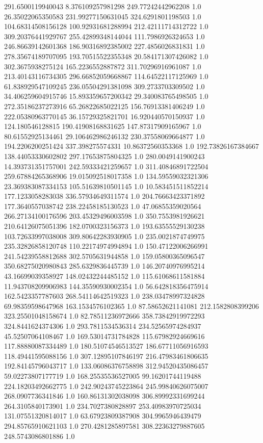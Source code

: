 291.6500119940043	8.376109257981298	249.77242442962208	1.0
26.35022065350583	231.99277150631045	324.6291801198503	1.0
104.68314508156128	100.92931681288994	212.42111714312722	1.0
309.20376441929767	255.42899348144044	111.7986926324653	1.0
246.86639142601368	186.90316892385002	227.4856026831831	1.0
278.35674189707095	193.70515522355348	20.584171307426082	1.0
302.3675938275124	165.2236552887872	311.70296916961087	1.0
213.40143116734305	296.66852059668867	114.64522117125969	1.0
61.838929547109245	236.05504291381098	309.2733703309502	1.0
34.406259604915746	15.893359657200342	29.340083765498505	1.0
272.35186237273916	65.26822685022125	156.76913381406249	1.0
222.05380963770145	36.15729325821701	16.920440570150937	1.0
124.180546128815	190.41908168831625	147.87317909165967	1.0
80.61552925134461	29.106462986246132	230.37558069664877	1.0
194.2206200251424	337.398275574331	10.86372560353368	1.0
192.73826167384667	138.44053330602802	297.17653875804325	1.0
280.0049141900243	14.393731351757001	242.59333421259657	1.0
311.40846891722504	259.67884265368906	19.015092518017358	1.0
134.59559032321306	23.369383087334153	105.51639810501145	1.0
10.583451511852214	177.1233058283038	336.57934649311574	1.0
204.76663423371892	177.3640557038742	238.22458185130523	1.0
47.06855359020564	266.27134100176596	203.45329496003598	1.0
350.7553981926621	210.64126075051396	182.0700323156373	1.0
193.63555529130238	103.72633997038008	309.80642283930905	1.0
235.0021874749975	235.32826858120748	110.22174974994894	1.0
150.47122006266991	241.54239558812688	302.5705631944858	1.0
159.05800365096547	350.68275020980843	285.6329836445739	1.0
146.20740976995214	43.16699039358927	148.02432244485152	1.0
115.61068611581884	11.943708209906983	144.35590930002354	1.0
56.642818356475914	162.5423357787603	268.54114642519323	1.0
238.03478997324828	69.98359598647968	163.1534576102365	1.0
87.58652621141081	212.1582808399206	323.25501048158674	1.0
82.78511236972666	358.73842919972293	324.8441624374306	1.0
293.7811534536314	234.52565974284937	45.52507064108467	1.0
169.53014731784828	115.67982924669616	117.88880087334489	1.0
180.51074546513527	186.67711056916593	118.49441595088156	1.0
307.12895107846197	216.47983461806635	192.84145796043717	1.0
133.06086376758898	312.94520435086457	59.02273807177719	1.0
168.25535536527005	99.16201744119488	224.18203492662775	1.0
242.90243745223864	245.99840626075007	268.0907736341846	1.0
160.86131302038098	306.89992331699244	264.3105840173901	1.0
234.7027380828897	253.40983970725034	131.07551320814017	1.0
63.67923809387908	304.9965946439479	294.85765910621103	1.0
270.4281285897581	308.22363279887605	248.5743086801886	1.0
